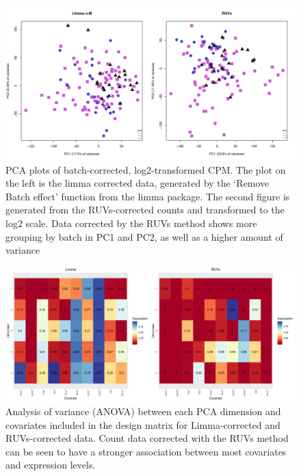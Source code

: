 \documentclass[12pt,a4paper,titlepage,twoside,openright]{book}
\begin{document}
\begin{mainmatter}
\begin{figure}[htb!]
\centering
\includegraphics[width=\textwidth,height=\textheight,keepaspectratio]{PCA_RUVvsLM_FirstDimension.pdf}
\caption{PCA plots of batch-corrected, log2-transformed CPM. The plot on the left is the limma corrected data, generated by the ‘Remove Batch effect’ function from the limma package. The second figure is generated from the RUVs-corrected counts and transformed to the log2 scale. Data corrected by the RUVs method shows more grouping by batch in PC1 and PC2, as well as a higher amount of variance}
\label{fig:RUV vs Limma: PCA by Batch}
\end{figure}


\begin{figure}[htb!]
\centering
\includegraphics[width=\textwidth,height=\textheight,keepaspectratio]{Heatmap_SigCovar_RUVvsLM_OnlyCovarInLM.pdf}
\caption{Analysis of variance (ANOVA) between each PCA dimension and covariates included in the design matrix for Limma-corrected and RUVs-corrected data. Count data corrected with the RUVs method can be seen to have a stronger association between most covariates and expression levels.}
\label{fig:RUV vs Limma: Heatmap of Covariates}
\end{figure}


\end{mainmatter}
\end{document}
